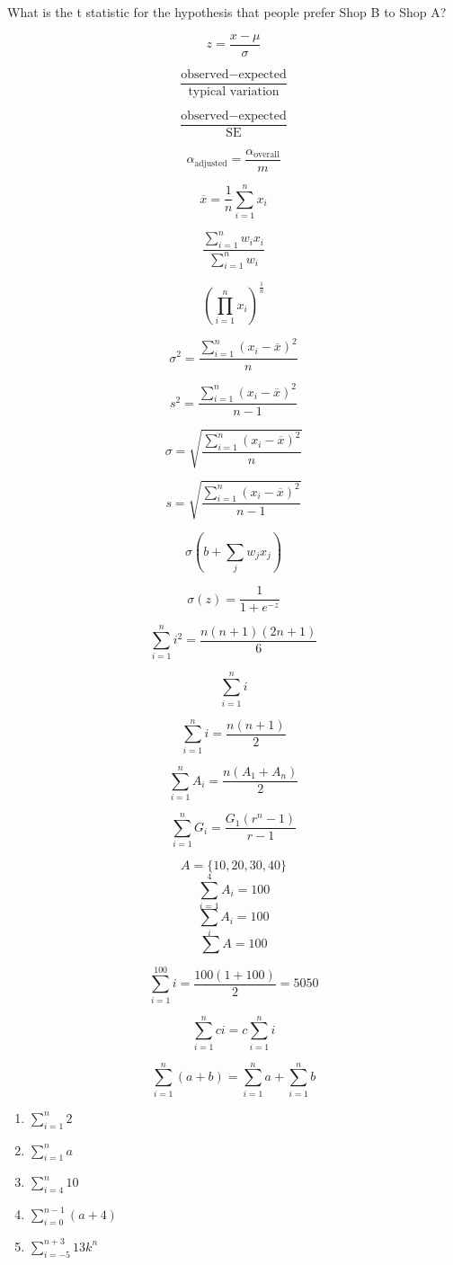 \documentclass[twocolumn]{article}
\begin{document}
What is the t statistic for the hypothesis that people prefer Shop B to Shop A?

\clearpage

$$ z = \frac{x - \mu}{\sigma} $$


$$ \frac{\text{observed} - \text{expected}}{\text{typical variation}} $$

$$ \frac{\text{observed} - \text{expected}}{\text{SE}} $$


$$ \alpha_{\text{adjusted}} = \frac{\alpha_{\text{overall}}}{m} $$

$$ \overline{x} = \frac{1}{n}\sum_{i=1}^{n} x_i $$

$$ \frac{\sum_{i=1}^{n} w_ix_i}{\sum_{i=1}^{n} w_i} $$

$$ \left( \prod_{i=1}^{n} x_i \right) ^{\frac{1}{n}} $$

$$ \sigma^2 = \frac{\sum_{i=1}^{n} (x_i - \overline{x})^2}{n} $$

$$ s^2 = \frac{\sum_{i=1}^{n} (x_i - \overline{x})^2}{n-1} $$

$$ \sigma = \sqrt{\frac{\sum_{i=1}^{n} (x_i - \overline{x})^2}{n}} $$

$$ s = \sqrt{\frac{\sum_{i=1}^{n} (x_i - \overline{x})^2}{n-1}} $$

$$ \sigma(b + \sum_j w_j x_j) $$

$$\sigma(z) = \frac{1}{1 + e^{-z}}$$
\iffalse

\clearpage

$$ \sum_{i=1}^{n} i^2 = \frac{n(n+1)(2n + 1)}{6} $$

$$ \sum_{i=1}^{n} i $$

$$ \sum_{i=1}^{n} i = \frac{n(n + 1)}{2} $$

$$ \sum_{i=1}^{n} A_i = \frac{n(A_1 + A_n)}{2} $$

$$ \sum_{i=1}^{n} G_i = \frac{G_1(r^n - 1)}{r -1} $$


$$ A = \{ 10, 20, 30, 40 \}$$
$$ \sum_{i=1}^{4} A_i = 100$$
$$ \sum_i A_i = 100$$
$$ \sum A = 100$$

$$ \sum_{i=1}^{100} i = \frac{100(1 + 100)}{2} = 5050$$






$$ \sum_{i=1}^{n} ci = c \sum_{i=1}^{n} i $$

$$ \sum_{i=1}^{n} (a + b) = \sum_{i=1}^{n} a + \sum_{i=1}^{n} b $$

\begin{enumerate}
    \item $ \sum_{i=1}^{n} 2 $

    \item $ \sum_{i=1}^{n} a $

    \item $ \sum_{i=4}^{n} 10 $

    \item $ \sum_{i=0}^{n-1} (a + 4) $

    \item $ \sum_{i=-5}^{n+3} 13k^n$
\end{enumerate}
\end{document}
